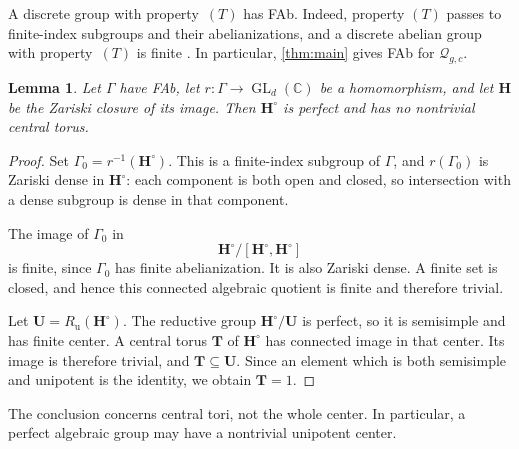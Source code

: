 \documentclass[11pt,a4paper]{article}
\newtheorem{lemma}[theorem]{Lemma}
\theoremstyle{definition}
\newcommand{\C}{\mathbb C}
\newcommand{\GL}{\operatorname{GL}}
\newcommand{\rt}{(T)}
\newcommand{\Ru}{R_{\mathrm u}}
\begin{document}
A discrete group with property~\(\rt\) has FAb. Indeed, property
\(\rt\) passes to finite-index subgroups and their abelianizations,
and a discrete abelian group with property~\(\rt\) is finite
\cite[Corollary~1.7.2]{BHV}. In particular, \cref{thm:main} gives FAb
for \(\mathcal{Q}_{g,c}\). 

\begin{lemma}\label{lem:fabclosure}
Let \(\Gamma\) have FAb, let \(r:\Gamma\to\GL_d(\C)\) be a
homomorphism, and let \(\mathbf H\) be the Zariski closure of its
image. Then \(\mathbf H^\circ\) is perfect and has no nontrivial
central torus.
\end{lemma}
\begin{proof}
Set \(\Gamma_0=r^{-1}(\mathbf H^\circ)\). This is a finite-index
subgroup of \(\Gamma\), and \(r(\Gamma_0)\) is Zariski dense in
\(\mathbf H^\circ\): each component is both open and closed, so
intersection with a dense subgroup is dense in that component.

The image of \(\Gamma_0\) in
\[
 \mathbf H^\circ/[\mathbf H^\circ,\mathbf H^\circ]
\]
is finite, since \(\Gamma_0\) has finite abelianization. It is also
Zariski dense. A finite set is closed, and hence this connected
algebraic quotient is finite and therefore trivial.

Let \(\mathbf U=\Ru(\mathbf H^\circ)\). The reductive group
\(\mathbf H^\circ/\mathbf U\) is perfect, so it is semisimple and
has finite center. A central torus \(\mathbf T\) of
\(\mathbf H^\circ\) has connected image in that center. Its image
is therefore trivial, and \(\mathbf T\subseteq\mathbf U\). Since an
element which is both semisimple and unipotent is the identity, we
obtain \(\mathbf T=1\).
\end{proof}

The conclusion concerns central tori, not the whole center. In
particular, a perfect algebraic group may have a nontrivial unipotent
center.
\end{document}
